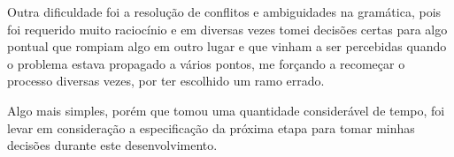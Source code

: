 \documentclass[12pt]{article}
\begin{document}
Outra dificuldade foi a resolução de conflitos e ambiguidades na gramática, pois foi requerido muito raciocínio e em diversas vezes tomei decisões certas para algo pontual que rompiam algo em outro lugar e que vinham a ser percebidas quando o problema estava propagado a vários pontos, me forçando a recomeçar o processo diversas vezes, por ter escolhido um ramo errado.

Algo mais simples, porém que tomou uma quantidade considerável de tempo, foi levar em consideração a especificação da próxima etapa para tomar minhas decisões durante este desenvolvimento.



\end{document}
